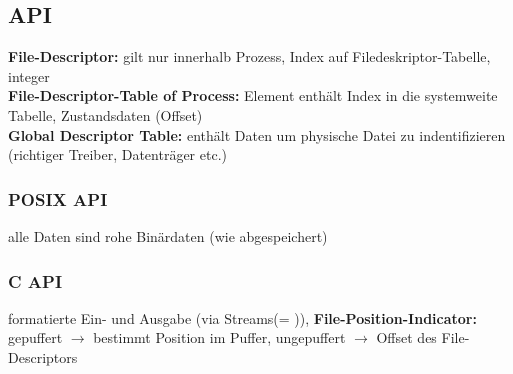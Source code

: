 \subsection{API}
\textbf{File-Descriptor:} gilt nur innerhalb Prozess, Index auf Filedeskriptor-Tabelle, integer\\
\textbf{File-Descriptor-Table of Process:} Element enthält Index in die systemweite Tabelle, Zustandsdaten (Offset) \\
\textbf{Global Descriptor Table:} enthält Daten um physische Datei zu indentifizieren (richtiger Treiber, Datenträger etc.)

\subsubsection{POSIX API}
alle Daten sind rohe Binärdaten (wie abgespeichert)

\subsubsection{C API}
formatierte Ein- und Ausgabe (via Streams(= )),
\textbf{File-Position-Indicator:} gepuffert $\rightarrow$ bestimmt Position im Puffer, ungepuffert $\rightarrow$ Offset des File-Descriptors














